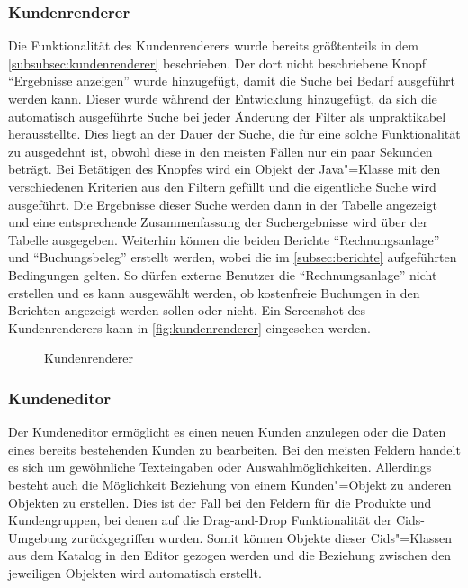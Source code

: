 \subsubsection{Kundenrenderer}
Die Funktionalität des Kundenrenderers wurde bereits größtenteils in dem \autoref{subsubsec:kundenrenderer} beschrieben.
Der dort nicht beschriebene Knopf "`Ergebnisse anzeigen"' wurde hinzugefügt, damit die Suche bei Bedarf ausgeführt werden kann.
Dieser wurde während der Entwicklung hinzugefügt, da sich die automatisch ausgeführte Suche bei jeder Änderung der Filter als unpraktikabel herausstellte.
Dies liegt an der Dauer der Suche, die für eine solche Funktionalität zu ausgedehnt ist, obwohl diese in den meisten Fällen nur ein paar Sekunden beträgt.
Bei Betätigen des Knopfes wird ein Objekt der Java"=Klasse  mit den verschiedenen Kriterien aus den Filtern gefüllt und die eigentliche Suche wird ausgeführt.
Die Ergebnisse dieser Suche werden dann in der Tabelle angezeigt und eine entsprechende Zusammenfassung der Suchergebnisse wird über der Tabelle ausgegeben.
Weiterhin können die beiden Berichte \enquote{Rechnungsanlage} und \enquote{Buchungsbeleg} erstellt werden, wobei die im \autoref{subsec:berichte} aufgeführten Bedingungen gelten.
So dürfen externe Benutzer die \enquote{Rechnungsanlage} nicht erstellen und es kann ausgewählt werden, ob kostenfreie Buchungen in den Berichten angezeigt werden sollen oder nicht.
Ein Screenshot des Kundenrenderers kann in \autoref{fig:kundenrenderer} eingesehen werden.

\begin{figure}[htb]
	\centering
	\caption{Kundenrenderer}
	\label{fig:kundenrenderer}
\end{figure}
\subsubsection{Kundeneditor}
Der Kundeneditor ermöglicht es einen neuen Kunden anzulegen oder die Daten eines bereits bestehenden Kunden zu bearbeiten.
Bei den meisten Feldern handelt es sich um gewöhnliche Texteingaben oder Auswahlmöglichkeiten.
Allerdings besteht auch die Möglichkeit Beziehung von einem Kunden"=Objekt zu anderen Objekten zu erstellen.
Dies ist der Fall bei den Feldern für die Produkte und Kundengruppen, bei denen auf die Drag-and-Drop Funktionalität der Cids-Umgebung zurückgegriffen wurden.
Somit können Objekte dieser Cids"=Klassen aus dem Katalog in den Editor gezogen werden und die Beziehung zwischen den jeweiligen Objekten wird automatisch erstellt.


